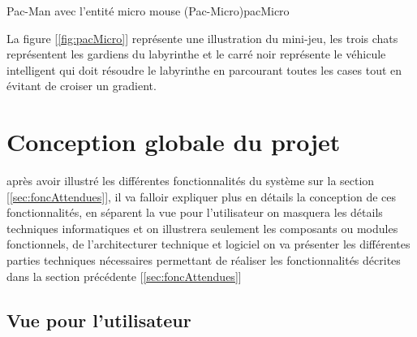 {Pac-Man avec l'entité micro mouse (Pac-Micro)}{pacMicro}

La figure [\ref{fig:pacMicro}] représente une illustration du mini-jeu, les trois chats représentent 
les gardiens du labyrinthe et le carré noir représente le véhicule intelligent qui 
doit résoudre le labyrinthe en parcourant toutes les cases tout en évitant de croiser un gradient.


\section{Conception globale du projet} \label{sec:conception}
   après avoir illustré les différentes fonctionnalités du système sur la
section [\ref{sec:foncAttendues}], il va falloir expliquer plus en détails
la conception de ces fonctionnalités, en séparent la vue pour l'utilisateur
on masquera les détails techniques informatiques et on illustrera seulement
les composants ou modules fonctionnels, de l'architecturer technique et
logiciel on va présenter les différentes parties techniques nécessaires
permettant de réaliser les fonctionnalités décrites dans la section
précédente [\ref{sec:foncAttendues}]

\subsection{Vue pour l’utilisateur} \label{sec:vueUtil}
   

